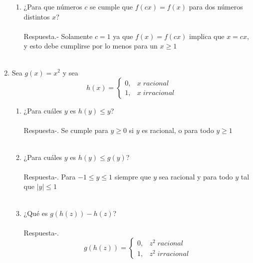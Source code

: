 \begin{enumerate}
\begin{enumerate}[\bfseries (i)]
		\item ¿Para que números $c$ se cumple que $f(cx)=f(x)$ para dos números distintos $x$?\\\\
		Respuesta.- \;  Solamente $c=1$ ya que $f(x)=f(cx)$ implica que $x=cx$, y esto debe cumplirse por lo menos para un $x \geq 1$\\\\

	    \end{enumerate}

	\item Sea $g(x)=x^2$ y sea 
	\begin{equation*}
	    h(x) = \left\lbrace
		\begin{array}{rl}
		    0, & x \; racional\\
		    1, & x \; irracional
		\end{array}
	    \right.
	\end{equation*}

	\begin{enumerate}[\bfseries (i)]

	    \item ¿Para cuáles $y$ es $h(y) \leq y$?\\\\
	    Respuesta-. \; Se cumple para $y\geq 0$ si $y$ es racional, o para todo $y\geq 1$\\\\

	    \item ¿Para cuáles $y$ es $h(y) \leq g(y)$?\\\\
	    Respuesta-. \; Para $-1\leq y \leq 1$ siempre que $y$ sea racional y para todo $y$ tal que $|y|\leq1$\\\\

	    \item ¿Qué es $g(h(z)) - h(z)$?\\\\
	    Respuesta-. \; 
	    \begin{equation*}
		g(h(z)) = \left\lbrace
		    \begin{array}{rl}
			0, & z^2 \; racional\\
			1, & z^2 \; irracional
		    \end{array}
		\right.
	    \end{equation*}


\end{enumerate}
\end{enumerate}
